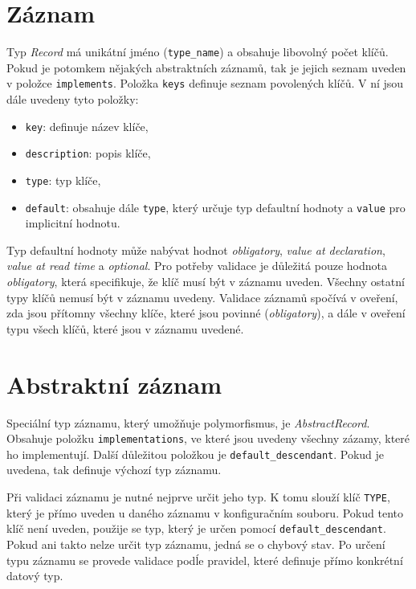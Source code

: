 \documentclass[FM,MP]{tulthesis}
\begin{document}
	\section{Záznam}
		Typ \textit{Record} má unikátní jméno (\texttt{type\_name}) a obsahuje libovolný počet klíčů. Pokud je potomkem nějakých abstraktních záznamů, tak je jejich seznam uveden v položce \texttt{implements}. Položka \texttt{keys} definuje seznam povolených klíčů. V ní jsou dále uvedeny tyto položky:
		\begin{itemize}
			\item \texttt{key}: definuje název klíče,
			\item \texttt{description}: popis klíče,
			\item \texttt{type}: typ klíče,
			\item \texttt{default}: obsahuje dále \texttt{type}, který určuje typ defaultní hodnoty a \texttt{value} pro implicitní hodnotu.
		\end{itemize}



		Typ defaultní hodnoty může nabývat hodnot \textit{obligatory}, \textit{value at declaration}, \textit{value at read time} a \textit{optional}. Pro potřeby validace je důležitá pouze hodnota \textit{obligatory}, která specifikuje, že klíč musí být v záznamu uveden. Všechny ostatní typy klíčů nemusí být v záznamu uvedeny. Validace záznamů spočívá v oveření, zda jsou přítomny všechny klíče, které jsou povinné (\textit{obligatory}), a dále v oveření typu všech klíčů, které jsou v záznamu uvedené.

	\section{Abstraktní záznam}
		Speciální typ záznamu, který umožňuje polymorfismus, je \textit{AbstractRecord}. Obsahuje položku \texttt{implementations}, ve které jsou uvedeny všechny zázamy, které ho implementují. Další důležitou položkou je \texttt{default\_descendant}. Pokud je uvedena, tak definuje výchozí typ záznamu.

		Při validaci záznamu je nutné nejprve určit jeho typ. K tomu slouží klíč \texttt{TYPE}, který je přímo uveden u daného záznamu v konfiguračním souboru. Pokud tento klíč není uveden, použije se typ, který je určen pomocí \texttt{default\_descendant}. Pokud ani takto nelze určit typ záznamu, jedná se o chybový stav. Po určení typu záznamu se provede validace podĺe pravidel, které definuje přímo konkrétní datový typ. 
\end{document}
